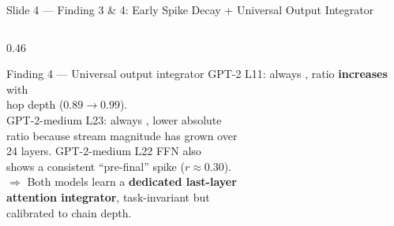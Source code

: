 \documentclass[aspectratio=169,10pt]{beamer}
\newcommand{\cmark}{\ding{51}}
\newcommand{\yes}[1]{\textcolor{teal}{\textbf{#1}}}
\begin{document}
\begin{frame}{Slide 4 — Finding 3 \& 4: Early Spike Decay + Universal Output Integrator}
\begin{columns}[T]
\begin{column}{0.46\textwidth}
\begin{block}{Finding 4 — Universal output integrator}
\medskip
GPT-2 L11: always \yes{\cmark{}}, ratio \textbf{increases} with\\
hop depth ($0.89 \to 0.99$).\\[4pt]
GPT-2-medium L23: always \yes{\cmark{}}, lower absolute\\
ratio because stream magnitude has grown over\\
24 layers. GPT-2-medium L22 FFN also\\
shows a consistent ``pre-final'' spike ($r \approx 0.30$).\\[4pt]
$\Rightarrow$ Both models learn a \textbf{dedicated last-layer}\\
\textbf{attention integrator}, task-invariant but\\
calibrated to chain depth.
\end{block}
\end{column}

\end{columns}
\end{frame}
\end{document}
